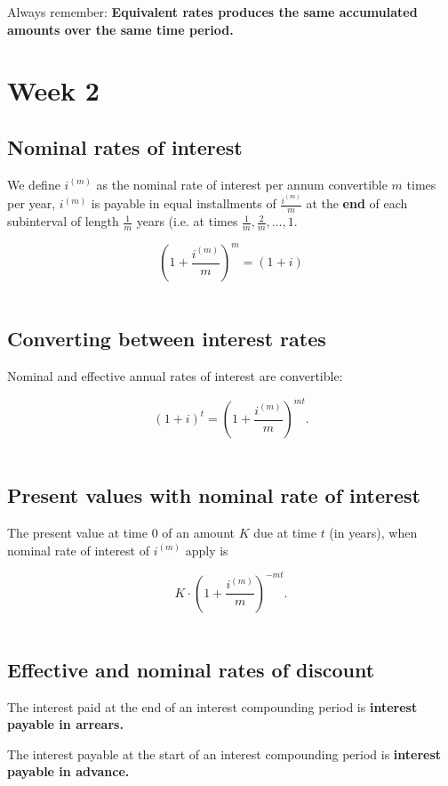 \documentclass[a4paper, 11pt, twoside]{article}
\begin{document}
Always remember: \textbf{Equivalent rates produces the same accumulated amounts over the same time period.}

\section{Week 2}

\subsection{Nominal rates of interest}

We define $i^{(m)}$ as the nominal rate of interest per annum convertible $m$ times per year, $i^{(m)}$  is payable in equal installments of $\frac{i^{(m)}}{m}$ at the \textbf{end} of each subinterval of length $\frac{1}{m}$ years (i.e. at times $\frac{1}{m}, \frac{2}{m}, \dots, 1.$

\[\left(1+\frac{i^{(m)}}{m}\right)^m = (1+i)\]\\

\subsection{Converting between interest rates}

Nominal and effective annual rates of interest are convertible:

\[(1+i)^t = \left(1+\frac{i^{(m)}}{m}\right)^{mt}.\]\\

\subsection{Present values with nominal rate of interest}

The present value at time 0 of an amount $K$ due at time $t$ (in years), when nominal rate of interest of $i^{(m)}$ apply is 

\[K\cdot\left(1+\frac{i^{(m)}}{m}\right)^{-mt}.\]\\

\subsection{Effective and nominal rates of discount}

The interest paid at the end of an interest compounding period is \textbf{interest payable in arrears.}

The interest payable at the start of an interest compounding period is \textbf{interest payable in advance.}\\
\end{document}
